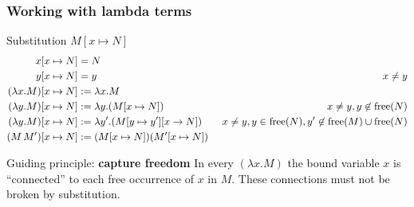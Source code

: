 \documentclass[pdftex,aspectratio=169]{beamer}
\begin{document}
\begin{frame}[fragile]
  \frametitle{Working with lambda terms}
  \begin{block}{Substitution $M[x\mapsto N]$}
    \vspace{-\baselineskip}
    \begin{alignat*}{2}
    x[x\mapsto N] & = N\\
    y[x\mapsto N] & = y \quad & x\neq y\\
    (\lambda x.M)[x\mapsto N] & := \lambda x.M\\
    (\lambda y.M)[x\mapsto N] & := \lambda y.(M[x\mapsto N])
    \quad & x\neq y, y\not\in\operatorname{free}(N)\\
    (\lambda y.M)[x\mapsto N] & := \lambda y'.(M[y\mapsto y'][x\rightarrow N])
    \quad & x\neq y, y\in\operatorname{free}(N), y'\not\in\operatorname{free}(M)\cup\operatorname{free}(N)\\
    (M\,M')[x\mapsto N] & := (M[x\mapsto N])(M'[x\mapsto N])
  \end{alignat*}
\end{block}
\begin{alertblock}{Guiding principle: \textbf{capture freedom}}
  In every $(\lambda x.M)$ the bound variable $x$ is ``connected'' to each
  free occurrence of $x$ in $M$. These connections must not be broken by
  substitution. 
\end{alertblock}
\end{frame}             
\end{document}
